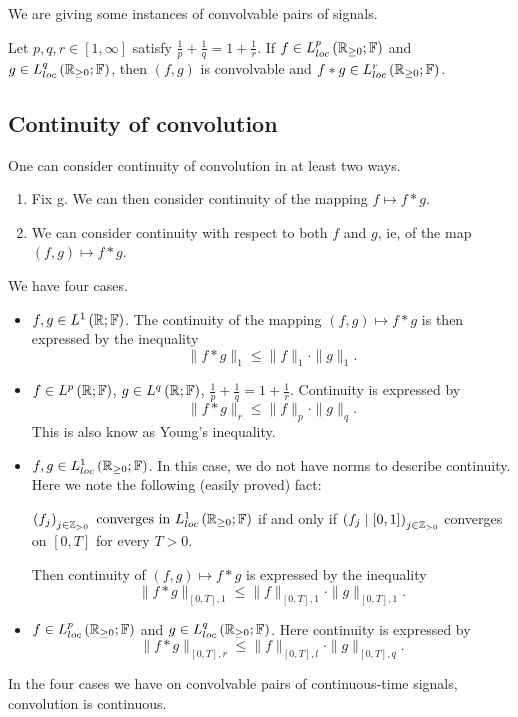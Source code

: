 
We are giving some instances of convolvable pairs of signals. 
\begin{theorem}
	Let $p, q, r \in  \left[ 1, \infty \right] $ satisfy $\frac{1}{p} + \frac{1}{q} = 1 + \frac{1}{r}$. If $f \in L^{p}_{loc}\left( \mathbb{R}_{\ge 0}; \mathbb{F} \right) $ and $g \in  L^{q}_{loc}\left( \mathbb{R}_{\ge 0}; \mathbb{F} \right) $, then $\left( f, g \right) $ is convolvable and $f * g \in  L^{r}_{loc}\left( \mathbb{R}_{\ge 0}; \mathbb{F} \right) $.
\end{theorem}

\subsection{Continuity of convolution}
One can consider continuity of convolution in at least two ways. 
\begin{enumerate}
	\item Fix g. We can then consider continuity of the mapping $f\longmapsto f * g$. 
	\item We can consider continuity with respect to both $f$ and $g$, ie, of the map $\left( f, g \right) \longmapsto f * g$. 
\end{enumerate}

We have four cases.
\begin{itemize}
	\item $f, g \in  L^{1}\left( \mathbb{R}; \mathbb{F} \right) $. The continuity of the mapping  $\left( f, g \right) \longmapsto f * g$ is then expressed by the inequality 
		\[
			\|f * g\|_{1} \le  \|f\|_{1} \cdot \|g\|_{1} 
		.\] 
	\item $f \in L^{p}\left( \mathbb{R}; \mathbb{F} \right) $, $g \in  L^{q}\left( \mathbb{R}; \mathbb{F} \right) $, $\frac{1}{p} + \frac{1}{q} = 1 + \frac{1}{r}$. Continuity is expressed by 
		\[
			\|f * g\|_{r} \le  \|f\|_{p} \cdot \|g\|_{q} 
		.\] 
		This is also know as Young's inequality.
	\item $f, g \in  L^{1}_{loc}\left( \mathbb{R}_{\ge 0}; \mathbb{F} \right) $. In this case, we do not have norms to describe continuity. Here we note the following (easily proved) fact: 

		$\left( f_{j} \right) _{j \in  \mathbb{Z}_{>0}} \text{ converges in } L^{1}_{loc}\left( \mathbb{R}_{\ge 0}; \mathbb{F} \right) $ if and only if $\left( f_{j}  \mid \left[  0, 1 \right]  \right) _{j \in  \mathbb{Z}_{>0}}$ converges on $\left[ 0, T \right] $ for every $T > 0$. 

		Then continuity of $\left( f, g  \right) \longmapsto f * g$ is expressed by the inequality 
		\[
		\|f * g\|_{\left[ 0, T \right] , 1} \le \|f\|_{\left[ 0, T \right] ,1} \cdot \|g\|_{\left[ 0, T \right] ,1}
		.\] 
	\item $f \in  L^{p}_{loc}\left( \mathbb{R} _{\ge 0}; \mathbb{F} \right) $ and $g \in L^{q}_{loc}\left( \mathbb{R}_{\ge 0}; \mathbb{F} \right) $. Here continuity is expressed by 
		\[
		\|f * g\|_{\left[ 0, T \right] , r} \le \|f\|_{\left[ 0, T \right] ,l} \cdot \|g\|_{\left[ 0, T \right] ,q}
		.\] 
\end{itemize}
\begin{punch}
	In the four cases we have on convolvable pairs of continuous-time signals, convolution is continuous. 
\end{punch}

